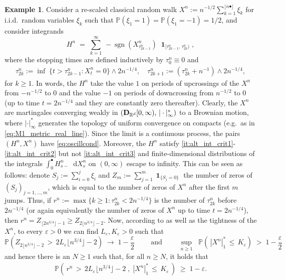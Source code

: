 \documentclass[11pt]{article}
\theoremstyle{definition}\newtheorem{example}[theorem]{Example}
\theoremstyle{definition}\newtheorem{counterexample}[theorem]{Counterexample}
\theoremstyle{definition}\newtheorem{remark}[theorem]{Remark}
\theoremstyle{definition}\newtheorem{defi}[theorem]{Definition}
\numberwithin{equation}{section}
\newcommand{\R}{\mathbb{R}}
\newcommand{\D}{{\bf D}}											%
\newcommand*\diff{\mathop{}\!\mathrm{d}}								%
\newcommand{\Pro}{\mathbb{P}}										%
\newcommand{\ind}{\operatorname{\mathbf{1}}}							%
\renewcommand{\sup}[1]{\underset{#1}{\operatorname{sup}}\;}					%
\renewcommand{\inf}[1]{\underset{#1}{\operatorname{inf}}\;}					%
\renewcommand{\|}{\; : \, \;}											%
\begin{document}
\begin{example}
	Consider a re-scaled classical random walk $X^n:= n^{-1/2} \sum_{k=1}^{\lfloor n \bullet \rfloor} \xi_k$ for i.i.d.~random variables $\xi_k$ such that $\Pro(\xi_1=1)=\Pro(\xi_1=-1)=1/2$, and consider integrands
	$$H^n \; = \; \sum_{k=1}^\infty  \, -\operatorname{sgn}(X^n_{\tau^n_{2k-1}})\; \ind_{[\tau^n_{2k-1},\, \tau^n_{2k})},$$ where the stopping times are defined inductively by $\tau^n_0\equiv 0$ and
	\begin{align*}
		\tau^n_{2k}:= \inf{} \{ t> \tau^n_{2k-1} : X^n_t = 0\} \wedge 2n^{-1/4}, \quad 
		\tau^n_{2k+1}:= (\tau^n_{2k}+n^{-1})\wedge 2n^{-1/4}, 
	\end{align*}
	for $k\ge 1$. In words, the $H^n$ take the value $1$ on periods of upcrossings of the $X^n$ from $-n^{-1/2}$ to $0$ and the value $-1$ on periods of downcrossing from $n^{-1/2}$ to $0$ (up to time $t=2n^{-1/4} $ and they are constantly zero thereafter). Clearly, the $X^n$ are martingales converging weakly in $(\D_{\R^d}[0,\infty), \, |\cdot|^*_\infty)$ to a Brownian motion, where $|\cdot|^*_\infty$ generates the topology of uniform convergence on compacts (e.g.~as in \eqref{eq:M1_metric_real_line}). Since the limit is a continuous process, the pairs $(H^n,X^n)$ have \eqref{eq:oscillcond}. Moreover, the $H^n$ satisfy \eqref{it:alt_int_crit1}-\eqref{it:alt_int_crit2} but not \eqref{it:alt_int_crit3} and finite-dimensional distributions of the integrals $\int_0^\bullet H^n_{s-} \diff X^n_s$ on $(0,\infty)$ escape to infinity. This can be seen as follows: denote $S_j:=\sum_{i=0}^j \xi_i$ and $Z_m:= \sum_{j=1}^m \ind_{\{S_j =0\}}$  the number of zeros of $(S_j)_{j=1,...,m}$, which is equal to the number of zeros of $X^n$ after the first $m$ jumps. Thus, if $r^n:= \operatorname{max}\{k \ge 1 : \tau^n_{2k} < 2n^{-1/4}\}$ is the number of $\tau^n_{2k}$ before $2n^{-1/4}$ (or again equivalently the number of zeros of $X^n$ up to time $t=2n^{-1/4}$), then $r^n=Z_{\lfloor 2n^{3/4} \rfloor-1}\ge Z_{2 \lfloor n^{3/4} \rfloor -2}$. Now, according to \cite[Thm.~4.3.5]{durrett} as well as the tightness of the $X^n$, to every $\varepsilon>0$ we can find $L_\varepsilon, K_\varepsilon>0$ such that 
	$$ \Pro( Z_{2 \lfloor n^{3/4} \rfloor -2} \, > \, 2L_\varepsilon \lfloor n^{3/4} \rfloor -2 ) \; \to \; 1- \frac\varepsilon 2 \qquad \text{ and } \qquad \sup{n\ge 1} \; \Pro (\, |X^n|^*_1 \, \le \, K_\varepsilon) \; > \; 1- \frac\varepsilon 2 $$
	and hence there is an $N\ge 1$ such that, for all $n\ge N$, it holds that 
	\begin{align}
		\Pro \left( \, r^n \, > \, 2L_\varepsilon \lfloor n^{3/4} \rfloor -2 \; , \; |X^n|^*_1 \, \le \, K_\varepsilon \, \right) \; \ge \; 1- \varepsilon. \label{eq:example_F3_not_omittable}

\end{align}
\end{example}
\end{document}
